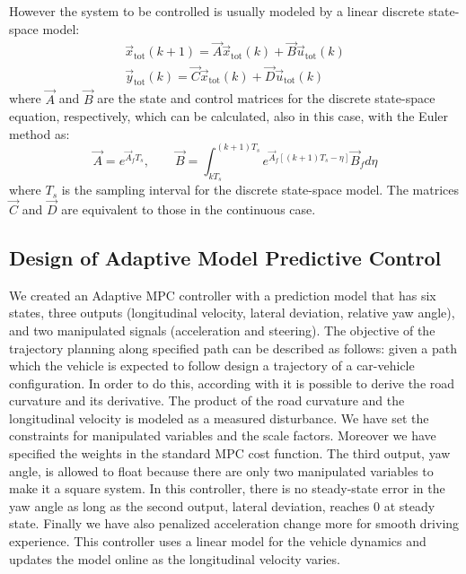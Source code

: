 However the system to be controlled is usually modeled by a linear discrete state-space model:
\begin{equation}
\label{eqn:full_dynamics_model_disc}
\begin{array}{rr}
{\vec{x}}_{\text{tot}}(k+1) =\vec{A} \vec{x}_{\text{tot}}(k)+ \vec{B} \vec{u}_{\text{tot}}(k)\\
\vec{y}_{\text{tot}}(k) = \vec{C}\vec{x}_{\text{tot}}(k) + \vec{D} \vec{u}_{\text{tot}}(k)
\end{array}
\end{equation}
where $\vec{A}$ and $\vec{B}$ are the state and control matrices for the discrete state-space equation, respectively, which can be calculated, also in this case, with the Euler method as:
\[
\vec{A} = e^{\vec{A}_fT_s},\qquad \vec{B} = \int_{kT_s}^{(k+1)T_s} e^{\vec{A}_f[(k+1)T_s-\eta]}\vec{B}_f d\eta
\]
where $T_s$ is the sampling interval for the discrete state-space model. The matrices $\vec{C}$ and $\vec{D}$ are equivalent to those in the continuous case.

\subsection{Design of Adaptive Model Predictive Control}
We created an Adaptive MPC controller with a prediction model that has six states, three outputs (longitudinal velocity, lateral deviation, relative yaw angle), and two manipulated signals (acceleration and steering). 
The objective of the trajectory planning along specified path can be described as follows: given a path which the vehicle is expected to follow design a trajectory of a car-vehicle configuration.
In order to do this, according with \cite{curvature} it is possible to derive the road curvature and its derivative.
The product of the road curvature and the longitudinal velocity is modeled as a measured disturbance. We have set the constraints for manipulated variables and the scale factors. Moreover we have specified the weights in the standard MPC cost function. The third output, yaw angle, is allowed to float because there are only two manipulated variables to make it a square system. In this controller, there is no steady-state error in the yaw angle as long as the second output, lateral deviation, reaches 0 at steady state. Finally we have also penalized acceleration change more for smooth driving experience. This controller uses a linear model for the vehicle dynamics and updates the model online as the longitudinal velocity varies.

